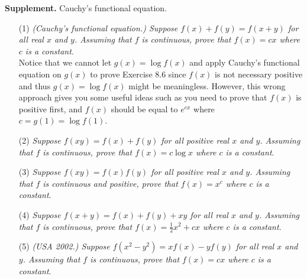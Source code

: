 \documentclass{article}
\begin{document}
\textbf{Supplement.} Cauchy's functional equation.
\begin{enumerate}
\item[(1)]
\emph{(Cauchy's functional equation.) Suppose $f(x) + f(y) = f(x + y)$ for all real $x$ and $y$.
Assuming that $f$ is continuous, prove that $f(x) = cx$ where $c$ is a constant}. \\

Notice that we cannot let $g(x) = \log f(x)$
and apply Cauchy's functional equation on $g(x)$
to prove Exercise 8.6 since $f(x)$ is not necessary positive and thus
$g(x) = \log f(x)$ might be meaningless.
However, this wrong approach gives you some useful ideas such as
you need to prove that $f(x)$ is positive first,
and $f(x)$ should be equal to $e^{cx}$ where $c = g(1) = \log f(1)$.

\item[(2)]
\emph{Suppose $f(xy) = f(x) + f(y)$ for all positive real $x$ and $y$.
Assuming that $f$ is continuous, prove that $f(x) = c \log x$ where $c$ is a constant}.

\item[(3)]
\emph{Suppose $f(xy) = f(x)f(y)$ for all positive real $x$ and $y$.
Assuming that $f$ is continuous and positive,
prove that $f(x) = x^c$ where $c$ is a constant}.

\item[(4)]
\emph{Suppose $f(x + y) = f(x) + f(y) + xy$ for all real $x$ and $y$.
Assuming that $f$ is continuous,
prove that $f(x) = \frac{1}{2}x^2 + cx$ where $c$ is a constant}.

\item[(5)]
\emph{(USA 2002.) Suppose $f(x^2 - y^2) = x f(x) - y f(y)$ for all real $x$ and $y$.
Assuming that $f$ is continuous,
prove that $f(x) = cx$ where $c$ is a constant}.
\end{enumerate}
\end{document}
